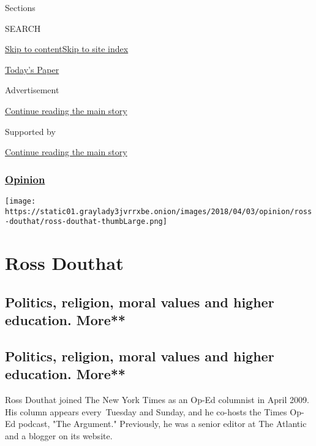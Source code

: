 Sections

SEARCH

\protect\hyperlink{site-content}{Skip to
content}\protect\hyperlink{site-index}{Skip to site index}

\href{https://myaccount.nytimes3xbfgragh.onion/auth/login?response_type=cookie\&client_id=vi}{}

\href{https://www.nytimes3xbfgragh.onion/section/todayspaper}{Today's
Paper}

Advertisement

\protect\hyperlink{after-top}{Continue reading the main story}

Supported by

\protect\hyperlink{after-sponsor}{Continue reading the main story}

\hypertarget{opinion}{%
\subsubsection{\texorpdfstring{\href{/section/opinion}{Opinion}}{Opinion}}\label{opinion}}

\texttt{[image: https://static01.graylady3jvrrxbe.onion/images/2018/04/03/opinion/ross-douthat/ross-douthat-thumbLarge.png]}

\hypertarget{ross-douthat}{%
\section{Ross Douthat}\label{ross-douthat}}

\hypertarget{politics-religion-moral-values-and-higher-education-more}{%
\subsection{Politics, religion, moral values and higher education.
More**}\label{politics-religion-moral-values-and-higher-education-more}}

\hypertarget{politics-religion-moral-values-and-higher-education-more-1}{%
\subsection{Politics, religion, moral values and higher education.
More**}\label{politics-religion-moral-values-and-higher-education-more-1}}

Ross Douthat joined The New York Times as an Op-Ed columnist in April
2009. His column appears every~Tuesday and Sunday, and he co-hosts the
Times Op-Ed podcast, "The Argument." Previously, he was a senior editor
at The Atlantic and a blogger on its website.~


